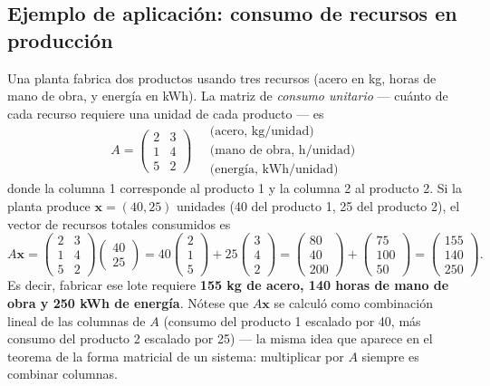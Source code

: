 \documentclass[11pt,letterpaper]{article}
\theoremstyle{definition}
\theoremstyle{plain}
\newcommand{\vv}[1]{\mathbf{#1}}
\begin{document}
\subsection{Ejemplo de aplicación: consumo de recursos en producción}\label{sec:produccion}

Una planta fabrica dos productos usando tres recursos (acero en kg, horas de mano de obra, y
energía en kWh). La matriz de \emph{consumo unitario} --- cuánto de cada recurso requiere una
unidad de cada producto --- es
\[
  A = \begin{pmatrix} 2 & 3 \\ 1 & 4 \\ 5 & 2 \end{pmatrix} \quad
  \begin{array}{l}\text{(acero, kg/unidad)} \\ \text{(mano de obra, h/unidad)} \\ \text{(energía, kWh/unidad)}\end{array}
\]
donde la columna 1 corresponde al producto 1 y la columna 2 al producto 2. Si la planta produce
$\vv{x}=(40,25)$ unidades (40 del producto 1, 25 del producto 2), el vector de recursos totales
consumidos es
\[
  A\vv{x} = \begin{pmatrix}2&3\\1&4\\5&2\end{pmatrix}\begin{pmatrix}40\\25\end{pmatrix}
  = 40\begin{pmatrix}2\\1\\5\end{pmatrix} + 25\begin{pmatrix}3\\4\\2\end{pmatrix}
  = \begin{pmatrix}80\\40\\200\end{pmatrix} + \begin{pmatrix}75\\100\\50\end{pmatrix}
  = \begin{pmatrix}155\\140\\250\end{pmatrix}.
\]
Es decir, fabricar ese lote requiere \textbf{155 kg de acero, 140 horas de mano de obra y 250 kWh
de energía}. Nótese que $A\vv{x}$ se calculó como combinación lineal de las columnas de $A$
(consumo del producto 1 escalado por 40, más consumo del producto 2 escalado por 25) --- la misma
idea que aparece en el teorema de la forma matricial de un sistema: multiplicar por $A$ siempre es
combinar columnas.
\end{document}
